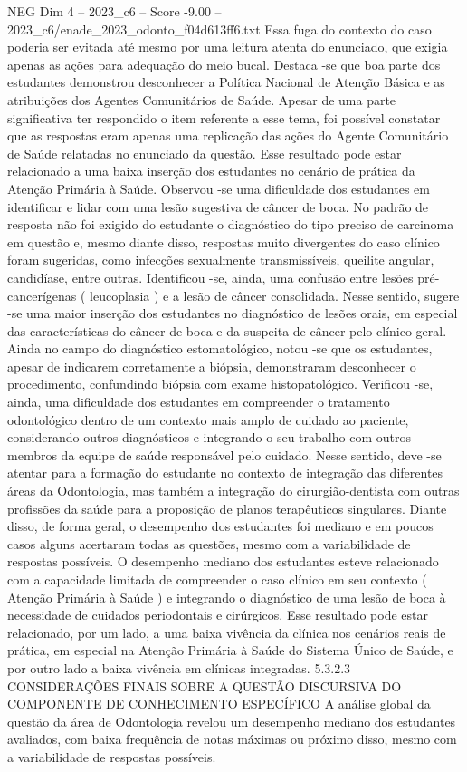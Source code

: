 \begin{textsample}{NEG Dim 4 – 2023\_c6 – Score -9.00 – 2023\_c6/enade\_2023\_odonto\_f04d613ff6.txt}
Essa fuga do contexto do caso poderia ser evitada até mesmo por uma leitura atenta do enunciado, que exigia apenas as ações para adequação do meio bucal.
Destaca -se que boa parte dos estudantes demonstrou desconhecer a Política Nacional de Atenção Básica e as atribuições dos Agentes Comunitários de Saúde.
Apesar de uma parte significativa ter respondido o item referente a esse tema, foi possível constatar que as respostas eram apenas uma replicação das ações do Agente Comunitário de Saúde relatadas no enunciado da questão.
Esse resultado pode estar relacionado a uma baixa inserção dos estudantes no cenário de prática da Atenção Primária à Saúde.
Observou -se uma dificuldade dos estudantes em identificar e lidar com uma lesão sugestiva de câncer de boca.
No padrão de resposta não foi exigido do estudante o diagnóstico do tipo preciso de carcinoma em questão e, mesmo diante disso, respostas muito divergentes do caso clínico foram sugeridas, como infecções sexualmente transmissíveis, queilite angular, candidíase, entre outras.
Identificou -se, ainda, uma confusão entre lesões pré-cancerígenas ( leucoplasia ) e a lesão de câncer consolidada.
Nesse sentido, sugere -se uma maior inserção dos estudantes no diagnóstico de lesões orais, em especial das características do câncer de boca e da suspeita de câncer pelo clínico geral.
Ainda no campo do diagnóstico estomatológico, notou -se que os estudantes, apesar de indicarem corretamente a biópsia, demonstraram desconhecer o procedimento, confundindo biópsia com exame histopatológico.
Verificou -se, ainda, uma dificuldade dos estudantes em compreender o tratamento odontológico dentro de um contexto mais amplo de cuidado ao paciente, considerando outros diagnósticos e integrando o seu trabalho com outros membros da equipe de saúde responsável pelo cuidado.
Nesse sentido, deve -se atentar para a formação do estudante no contexto de integração das diferentes áreas da Odontologia, mas também a integração do cirurgião-dentista com outras profissões da saúde para a proposição de planos terapêuticos singulares.
Diante disso, de forma geral, o desempenho dos estudantes foi mediano e em poucos casos alguns acertaram todas as questões, mesmo com a variabilidade de respostas possíveis.
O desempenho mediano dos estudantes esteve relacionado com a capacidade limitada de compreender o caso clínico em seu contexto ( Atenção Primária à Saúde ) e integrando o diagnóstico de uma lesão de boca à necessidade de cuidados periodontais e cirúrgicos.
Esse resultado pode estar relacionado, por um lado, a uma baixa vivência da clínica nos cenários reais de prática, em especial na Atenção Primária à Saúde do Sistema Único de Saúde, e por outro lado a baixa vivência em clínicas integradas. 5.3.2.3 CONSIDERAÇÕES FINAIS SOBRE A QUESTÃO DISCURSIVA DO COMPONENTE DE CONHECIMENTO ESPECÍFICO A análise global da questão da área de Odontologia revelou um desempenho mediano dos estudantes avaliados, com baixa frequência de notas máximas ou próximo disso, mesmo com a variabilidade de respostas possíveis.

\end{textsample}
